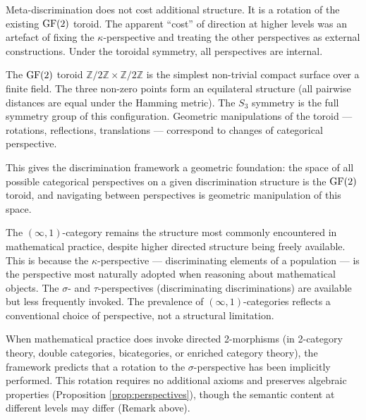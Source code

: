 \begin{corollary}\label{cor:free-direction}
Meta-discrimination does not cost additional structure.
It is a rotation of the existing $\operatorname{GF}(2)$ toroid. The
apparent ``cost'' of direction at higher levels was an
artefact of fixing the $\kappa$-perspective and treating
the other perspectives as external constructions. Under
the toroidal symmetry, all perspectives are internal.
\end{corollary}

\begin{remark}
The $\operatorname{GF}(2)$ toroid $\mathbb{Z}/2\mathbb{Z} \times
\mathbb{Z}/2\mathbb{Z}$ is the simplest non-trivial
compact surface over a finite field. The three non-zero
points form an equilateral structure (all pairwise
distances are equal under the Hamming metric). The
$S_3$ symmetry is the full symmetry group of this
configuration. Geometric manipulations of the toroid ---
rotations, reflections, translations --- correspond to
changes of categorical perspective.

This gives the discrimination framework a geometric
foundation: the space of all possible categorical
perspectives on a given discrimination structure is
the $\operatorname{GF}(2)$ toroid, and navigating between perspectives
is geometric manipulation of this space.
\end{remark}

\begin{remark}
The $(\infty,1)$-category remains the structure most
commonly encountered in mathematical practice, despite
higher directed structure being freely available. This
is because the $\kappa$-perspective --- discriminating
elements of a population --- is the perspective most
naturally adopted when reasoning about mathematical
objects. The $\sigma$- and $\tau$-perspectives
(discriminating discriminations) are available but less
frequently invoked. The prevalence of $(\infty,1)$-categories
reflects a conventional choice of perspective, not a
structural limitation.

When mathematical practice does invoke directed
2-morphisms (in 2-category theory, double categories,
bicategories, or enriched category theory), the framework
predicts that a rotation to the $\sigma$-perspective has
been implicitly performed. This rotation requires no
additional axioms and preserves algebraic properties
(Proposition \ref{prop:perspectives}), though the
semantic content at different levels may differ
(Remark above).
\end{remark}

